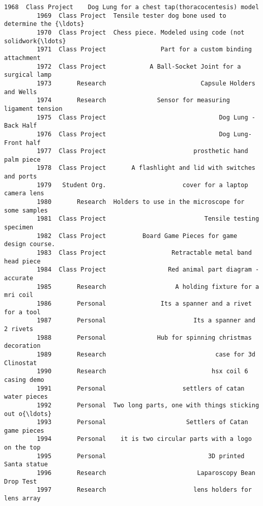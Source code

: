 \documentclass[11pt]{article}
\begin{document}
\begin{Verbatim}[commandchars=\\\{\}]
         1968  Class Project    Dog Lung for a chest tap(thoracocentesis) model   
         1969  Class Project  Tensile tester dog bone used to determine the {\ldots}   
         1970  Class Project  Chess piece. Modeled using code (not solidwork{\ldots}   
         1971  Class Project               Part for a custom binding attachment   
         1972  Class Project            A Ball-Socket Joint for a surgical lamp   
         1973       Research                          Capsule Holders and Wells   
         1974       Research              Sensor for measuring ligament tension   
         1975  Class Project                               Dog Lung - Back Half   
         1976  Class Project                               Dog Lung- Front half   
         1977  Class Project                        prosthetic hand palm piece    
         1978  Class Project       A flashlight and lid with switches and ports   
         1979   Student Org.                     cover for a laptop camera lens   
         1980       Research  Holders to use in the microscope for some samples   
         1981  Class Project                           Tensile testing specimen   
         1982  Class Project          Board Game Pieces for game design course.   
         1983  Class Project                  Retractable metal band head piece   
         1984  Class Project                 Red animal part diagram - accurate   
         1985       Research                   A holding fixture for a mri coil   
         1986       Personal               Its a spanner and a rivet for a tool   
         1987       Personal                        Its a spanner and 2 rivets    
         1988       Personal              Hub for spinning christmas decoration   
         1989       Research                              case for 3d Clinostat   
         1990       Research                             hsx coil 6 casing demo   
         1991       Personal                     settlers of catan water pieces   
         1992       Personal  Two long parts, one with things sticking out o{\ldots}   
         1993       Personal                      Settlers of Catan game pieces   
         1994       Personal    it is two circular parts with a logo on the top   
         1995       Personal                            3D printed Santa statue   
         1996       Research                         Laparoscopy Bean Drop Test   
         1997       Research                        lens holders for lens array   
         

\end{Verbatim}
\end{document}
